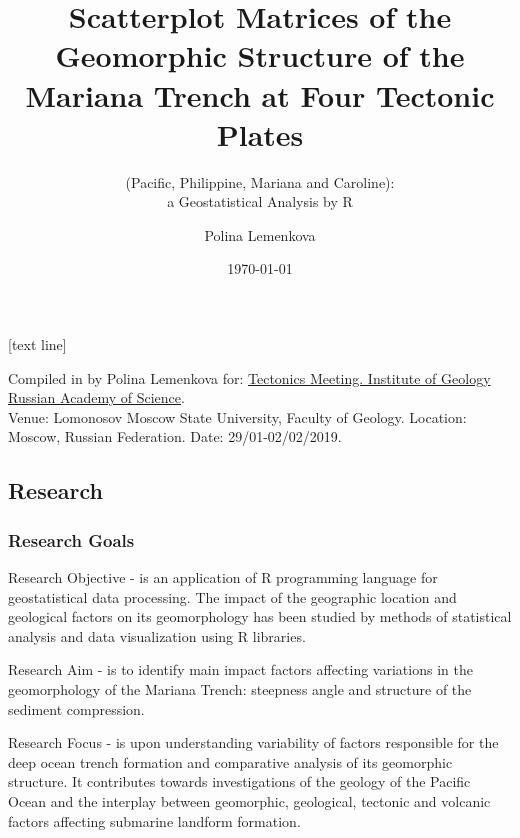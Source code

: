 \documentclass[pdflatex,compress,10pt,
	xcolor={dvipsnames,dvipsnames,svgnames,x11names,table},
	hyperref={colorlinks = true,breaklinks = true, urlcolor = NavyBlue, breaklinks = true}]{beamer}
\title{Scatterplot Matrices of the Geomorphic Structure of the Mariana Trench at Four Tectonic Plates}
\subtitle{(Pacific, Philippine, Mariana and Caroline): \\a Geostatistical Analysis by R}
\author{Polina Lemenkova}
\institute{Ocean University of China, College of Marine Geo-Sciences}
\date{\today}
\begin{document}
\maketitle

[text line]{%
\parbox{\linewidth}{\vspace*{-8pt}Compiled in \LuaLaTeX \space by Polina Lemenkova for: \href{http://www.ginras.ru/struct/5/20/index.php}{ Tectonics Meeting. Institute of Geology Russian Academy of Science}.\\ Venue: Lomonosov Moscow State University, Faculty of Geology. Location: Moscow, Russian Federation. Date: 29/01-02/02/2019.} \hfill\insertpagenumber}




\subsection{Research}

\begin{frame}\frametitle{Research Goals}
	\begin{exampleblock}{Research Objective}
- is an application of R programming language for geostatistical data processing. The impact of the geographic location and geological factors on its geomorphology has been studied by methods of statistical analysis and data visualization using R libraries.
	\end{exampleblock}
	\begin{exampleblock}{Research Aim}
- is to identify main impact factors affecting variations in the geomorphology of the Mariana Trench: steepness angle and structure of the sediment compression. 
	\end{exampleblock}
	\begin{alertblock}{Research Focus}
- is upon understanding variability of factors responsible for the deep ocean trench formation and comparative analysis of its geomorphic structure. It contributes towards investigations of the geology of the Pacific Ocean and the interplay between geomorphic, geological, tectonic and volcanic factors affecting submarine landform formation.
	\end{alertblock}
\end{frame}
	
\end{document}
